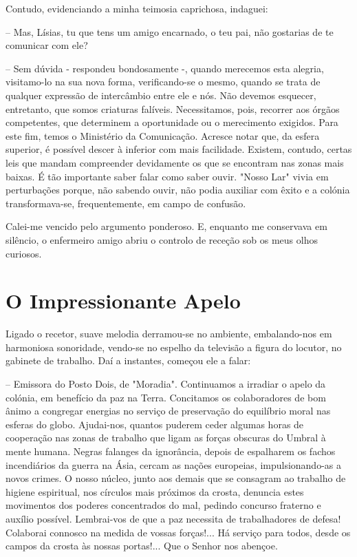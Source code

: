 \documentclass[portuguese,12pt,a4paper]{scrbook}
\begin{document}
	Contudo, evidenciando a minha teimosia caprichosa, indaguei:
	
	– Mas, Lísias, tu que tens um amigo encarnado, o teu pai, não gostarias de te comunicar com ele?
	
	– Sem dúvida - respondeu bondosamente -, quando merecemos esta alegria, visitamo-lo na sua nova forma, verificando-se o mesmo, quando se trata de qualquer expressão de intercâmbio entre ele e nós. Não devemos esquecer, entretanto, que somos criaturas falíveis. Necessitamos, pois, recorrer aos órgãos competentes, que determinem a oportunidade ou o merecimento exigidos. Para este fim, temos o Ministério da Comunicação. Acresce notar que, da esfera superior, é possível descer à inferior com mais facilidade. Existem, contudo, certas leis que mandam compreender devidamente os que se encontram nas zonas mais baixas. É tão importante saber falar como saber ouvir. "Nosso Lar" vivia em perturbações porque, não sabendo ouvir, não podia auxiliar com êxito e a colónia transformava-se, frequentemente, em campo de confusão.
	
	Calei-me vencido pelo argumento ponderoso. E, enquanto me conservava em silêncio, o enfermeiro amigo abriu o controlo de receção sob os meus olhos curiosos.
	
	
	\chapter{O Impressionante Apelo}
	
	Ligado o recetor, suave melodia derramou-se no ambiente, embalando-nos em harmoniosa sonoridade, vendo-se no espelho da televisão a figura do locutor, no gabinete de trabalho. Daí a instantes, começou ele a falar:
	
	– Emissora do Posto Dois, de "Moradia". Continuamos a irradiar o apelo da colónia, em benefício da paz na Terra. Concitamos os colaboradores de bom ânimo a congregar energias no serviço de preservação do equilíbrio moral nas esferas do globo. Ajudai-nos, quantos puderem ceder algumas horas de cooperação nas zonas de trabalho que ligam as forças obscuras do Umbral à mente humana. Negras falanges da ignorância, depois de espalharem os fachos incendiários da guerra na Ásia, cercam as nações europeias, impulsionando-as a novos crimes. O nosso núcleo, junto aos demais que se consagram ao trabalho de higiene espiritual, nos círculos mais próximos da crosta, denuncia estes movimentos dos poderes concentrados do mal, pedindo concurso fraterno e auxílio possível. Lembrai-vos de que a paz necessita de trabalhadores de defesa! Colaborai connosco na medida de vossas forças!... Há serviço para todos, desde os campos da crosta às nossas portas!... Que o Senhor nos abençoe.
	
\end{document}
